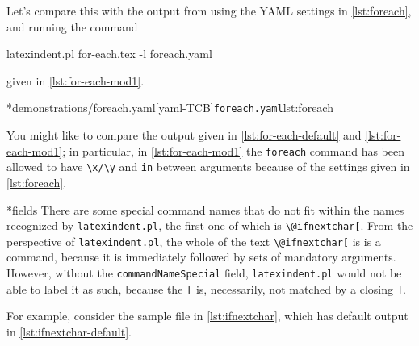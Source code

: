 	Let's compare this with the output from using the YAML settings in \cref{lst:foreach}, and running the command \begin{commandshell}
latexindent.pl for-each.tex -l foreach.yaml  
\end{commandshell} given in \cref{lst:for-each-mod1}.

	\begin{minipage}{.45\textwidth}
	\end{minipage}
	\hfill
	\begin{minipage}{.49\textwidth}
		\cmhlistingsfromfile*[style=yaml-LST]*{demonstrations/foreach.yaml}[yaml-TCB]{\texttt{foreach.yaml}}{lst:foreach}
	\end{minipage}

	You might like to compare the output given in \cref{lst:for-each-default} and \cref{lst:for-each-mod1}; in particular, in \cref{lst:for-each-mod1} the \texttt{foreach} command has been allowed to have \lstinline!\x/\y! and \texttt{in} between arguments because of the settings given in \cref{lst:foreach}.

*{fields}
	There are some special command names%
	 that do not fit within the names recognized by \texttt{latexindent.pl}, the first one of which is \lstinline!\@ifnextchar[!.
	From the perspective of \texttt{latexindent.pl}, the whole of the text \lstinline!\@ifnextchar[! is is a command, because it is immediately followed by sets of mandatory arguments.
	However, without the \texttt{commandNameSpecial} field, \texttt{latexindent.pl} would not be able to label it as such, because the \lstinline![! is, necessarily, not matched by a closing \lstinline!]!.

	For example, consider the sample file in \cref{lst:ifnextchar}, which has default output in \cref{lst:ifnextchar-default}.

	\begin{minipage}{.45\textwidth}
	\end{minipage}
	\hfill
	\begin{minipage}{.45\textwidth}
	\end{minipage}

